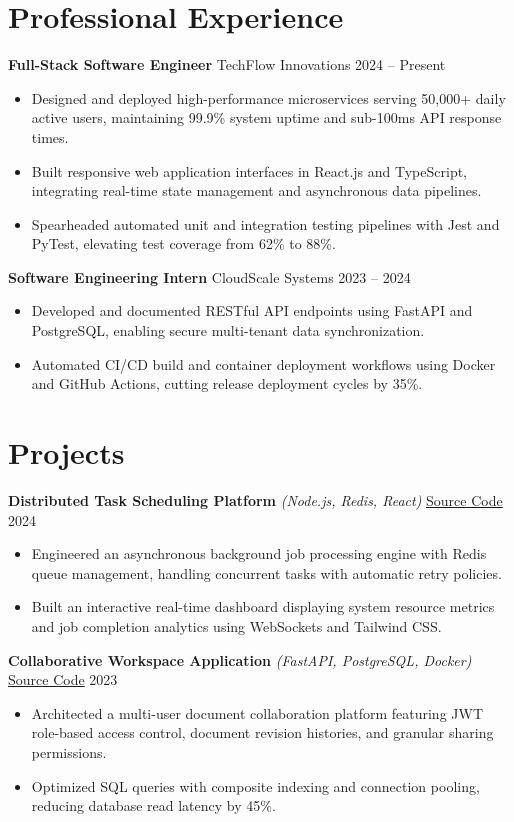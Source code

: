 \documentclass[10pt,a4paper]{article}
\begin{document}
\section*{Professional Experience}

\textbf{Full-Stack Software Engineer} \hfill TechFlow Innovations \hfill 2024 -- Present
\begin{itemize}
    \item Designed and deployed high-performance microservices serving 50,000+ daily active users, maintaining 99.9\% system uptime and sub-100ms API response times.
    \item Built responsive web application interfaces in React.js and TypeScript, integrating real-time state management and asynchronous data pipelines.
    \item Spearheaded automated unit and integration testing pipelines with Jest and PyTest, elevating test coverage from 62\% to 88\%.
\end{itemize}

\textbf{Software Engineering Intern} \hfill CloudScale Systems \hfill 2023 -- 2024
\begin{itemize}
    \item Developed and documented RESTful API endpoints using FastAPI and PostgreSQL, enabling secure multi-tenant data synchronization.
    \item Automated CI/CD build and container deployment workflows using Docker and GitHub Actions, cutting release deployment cycles by 35\%.
\end{itemize}

\section*{Projects}

\textbf{Distributed Task Scheduling Platform} \textit{(Node.js, Redis, React)} \hfill \href{https://github.com}{Source Code} \hfill 2024
\begin{itemize}
    \item Engineered an asynchronous background job processing engine with Redis queue management, handling concurrent tasks with automatic retry policies.
    \item Built an interactive real-time dashboard displaying system resource metrics and job completion analytics using WebSockets and Tailwind CSS.
\end{itemize}

\textbf{Collaborative Workspace Application} \textit{(FastAPI, PostgreSQL, Docker)} \hfill \href{https://github.com}{Source Code} \hfill 2023
\begin{itemize}
    \item Architected a multi-user document collaboration platform featuring JWT role-based access control, document revision histories, and granular sharing permissions.
    \item Optimized SQL queries with composite indexing and connection pooling, reducing database read latency by 45\%.
\end{itemize}
\end{document}
